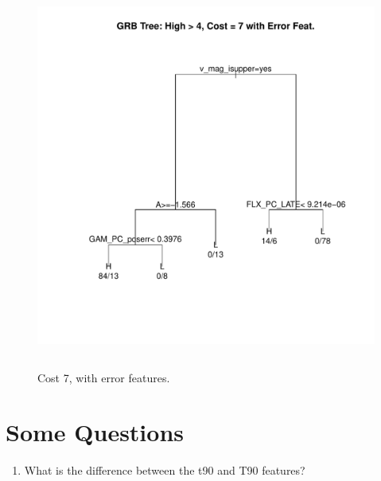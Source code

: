 \documentclass[10pt]{article}
\begin{document}
\begin{figure}[H]
\begin{center}
\includegraphics[height=5in,width=5in]{ErrorCost7.pdf}
\caption{Cost 7, with error features.\label{fig:ErrorCost7}}
\end{center}
\end{figure}


\section{Some Questions}
\begin{enumerate}
\item What is the difference between the t90 and T90 features?
\end{enumerate}
\end{document}
